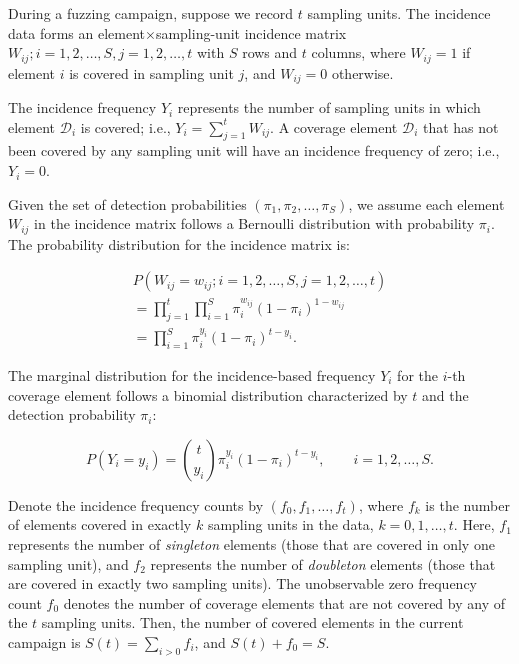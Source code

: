 \documentclass[conference,anonymous,review]{IEEEtran}
\begin{document}
During a fuzzing campaign, suppose we record $t$ sampling units. The incidence data forms an element$\times$sampling-unit incidence matrix ${W_{ij};i=1,2,\dots,S,j=1,2,\dots,t}$ with $S$ rows and $t$ columns, where $W_{ij} = 1$ if element $i$ is covered in sampling unit $j$, and $W_{ij} = 0$ otherwise.

The incidence frequency $Y_i$ represents the number of sampling units in which element $\mathcal{D}_i$ is covered; i.e., $Y_i=\sum_{j=1}^{t}W_{ij}$. A coverage element $\mathcal{D}_i$ that has not been covered by any sampling unit will have an incidence frequency of zero; i.e., $Y_i=0$.

Given the set of detection probabilities $(\pi_1,\pi_2,\dots,\pi_S)$, we assume each element $W_{ij}$ in the incidence matrix follows a Bernoulli distribution with probability $\pi_i$. The probability distribution for the incidence matrix is:

\begin{equation}
    \begin{split}
        P(W_{ij}=w_{ij};i=1,2,\dots,S,j=1,2,\dots,t) \\
        = \prod_{j=1}^{t}\prod_{i=1}^{S}\pi_i^{w_{ij}}(1-\pi_i)^{1-w_{ij}} \\
        = \prod_{i=1}^{S}\pi_i^{y_i}(1-\pi_i)^{t-y_i}.
    \end{split}
\end{equation}

The marginal distribution for the incidence-based frequency $Y_i$ for the $i$-th coverage element follows a binomial distribution characterized by $t$ and the detection probability $\pi_i$:

\begin{equation}
    P(Y_i=y_i) = \binom{t}{y_i}\pi_i^{y_i}(1-\pi_i)^{t-y_i}, \qquad i=1,2,\dots,S.
\end{equation}

Denote the incidence frequency counts by $(f_0, f_1, \dots, f_t)$, where $f_k$ is the number of elements covered in exactly $k$ sampling units in the data, $k=0,1,\dots,t$. Here, $f_1$ represents the number of \emph{singleton} elements (those that are covered in only one sampling unit), and $f_2$ represents the number of \emph{doubleton} elements (those that are covered in exactly two sampling units). The unobservable zero frequency count $f_0$ denotes the number of coverage elements that are not covered by any of the $t$ sampling units. Then, the number of covered elements in the current campaign is $S(t)=\sum_{i>0}f_i$, and $S(t)+f_0=S$.
\end{document}
